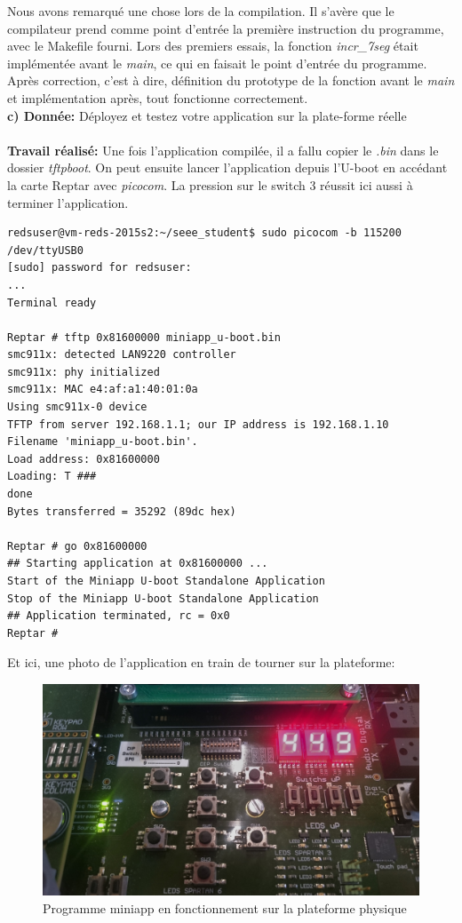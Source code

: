 Nous avons remarqué une chose lors de la compilation. Il s'avère que le compilateur prend comme point d'entrée la première instruction du programme, avec le Makefile fourni. Lors des premiers essais, la fonction \textit{incr\_7seg} était implémentée avant le \textit{main}, ce qui en faisait le point d'entrée du programme. Après correction, c'est à dire, définition du prototype de la fonction avant le \textit{main} et implémentation après, tout fonctionne correctement.\\


\textbf{c) Donnée: }Déployez et testez votre application sur la plate-forme réelle\\\\
\textbf{Travail réalisé: }Une fois l'application compilée, il a fallu copier le \textit{.bin} dans le dossier \textit{tftpboot}. On peut ensuite lancer l'application depuis l'U-boot en accédant la carte Reptar avec \textit{picocom}. La pression sur le switch 3 réussit ici aussi à terminer l'application.
\begin{lstlisting}
redsuser@vm-reds-2015s2:~/seee_student$ sudo picocom -b 115200 /dev/ttyUSB0
[sudo] password for redsuser: 
...
Terminal ready

Reptar # tftp 0x81600000 miniapp_u-boot.bin
smc911x: detected LAN9220 controller
smc911x: phy initialized
smc911x: MAC e4:af:a1:40:01:0a
Using smc911x-0 device
TFTP from server 192.168.1.1; our IP address is 192.168.1.10
Filename 'miniapp_u-boot.bin'.
Load address: 0x81600000
Loading: T ###
done
Bytes transferred = 35292 (89dc hex)

Reptar # go 0x81600000
## Starting application at 0x81600000 ...
Start of the Miniapp U-boot Standalone Application
Stop of the Miniapp U-boot Standalone Application
## Application terminated, rc = 0x0
Reptar # 
\end{lstlisting}

Et ici, une photo de l'application en train de tourner sur la plateforme:
\begin{figure}[H]
    \begin{center}
        \includegraphics[width=15cm]{img/miniapp_reptar.JPG}
        \caption{Programme miniapp en fonctionnement sur la plateforme physique}
        \label{miniapp_reptar}
    \end{center}
\end{figure}
